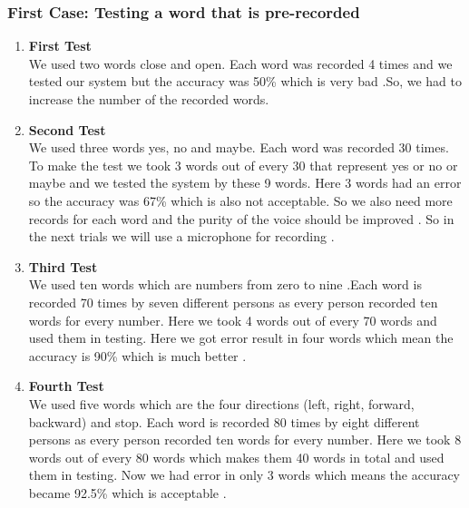\documentclass[12pt, a4paper, twoside]{report}
\begin{document}
\subsubsection{First Case: Testing a word that is pre-recorded}
\begin{enumerate}
\item \textbf{First Test} \\
We used two words close and open. Each word was recorded 4 times and we tested our system but the accuracy was 50\% which is very bad .So, we had to increase the number of the recorded words.
\item \textbf{Second Test} \\
We used three words yes, no and maybe. Each word was recorded 30 times. To make the test we took 3 words out of every 30 that represent yes or no or maybe and we tested the system by these 9 words. Here 3 words had an error so the accuracy was 67\% which is also not acceptable. So we also need more records for each word and the purity of the voice should be improved . So in the next trials we will use a microphone for recording .
\item \textbf{Third Test} \\ 
We used ten words which are numbers from zero to nine .Each word is recorded 70 times by seven different persons as every person recorded ten words for every number. Here we took 4 words out of every 70 words and used them in testing. Here we got error result in four words which mean the accuracy is 90\% which is much better .
\item \textbf{Fourth Test} \\
We used five words which are the four directions (left, right, forward, backward) and stop. Each word is recorded 80 times by eight different persons as every person recorded ten words for every number. Here we took 8 words out of every 80 words which makes them 40 words in total and used them in testing. Now we had error in only 3 words which means the accuracy became 92.5\% which is acceptable .
\end{enumerate}
\end{document}
